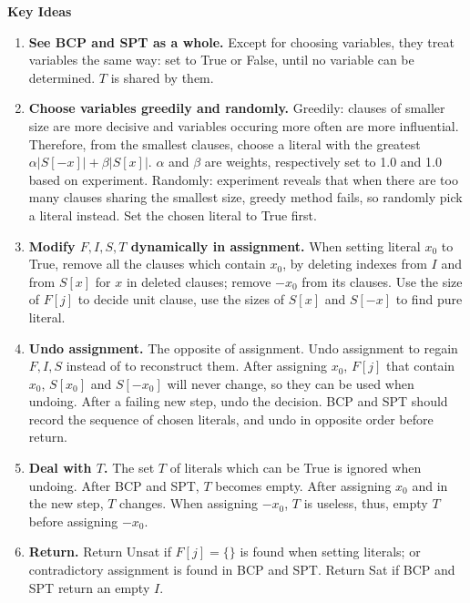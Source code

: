 \documentclass{article}
\begin{document}
	\textbf{Key Ideas}
	\begin{enumerate}
		\item \textbf{See BCP and SPT as a whole.} Except for choosing variables, they treat variables the same way: set to True or False, until no variable can be determined. $T$ is shared by them.
		\item \textbf{Choose variables greedily and randomly.} Greedily: clauses of smaller size are more decisive and variables occuring more often are more influential. Therefore, from the smallest clauses, choose a literal with the greatest $\alpha  |S[-x]| + \beta |S[x]|$. $\alpha$ and $\beta$ are weights, respectively set to 1.0 and 1.0 based on experiment. Randomly: experiment reveals that when there are too many clauses sharing the smallest size, greedy method fails, so randomly pick a literal instead. Set the chosen literal to True first.
		\item \textbf{Modify $F, I, S, T$ dynamically in assignment.} When setting literal $x_0$ to True, remove all the clauses which contain $x_0$, by deleting indexes from $I$ and from $S[x]$ for $x$ in deleted clauses; remove $-x_0$ from its clauses. Use the size of $F[j]$ to decide unit clause, use the sizes of $S[x]$ and $S[-x]$ to find pure literal.
		\item \textbf{Undo assignment.} The opposite of assignment. Undo assignment to regain $F, I, S$ instead of to reconstruct them.
		After assigning $x_0$, $F[j]$ that contain $x_0$, $S[x_0]$ and $S[-x_0]$ will never change, so they can be used when undoing.
		After a failing new step, undo the decision. 
		BCP and SPT should record the sequence of chosen literals, and undo in opposite order before return. 
		\item \textbf{Deal with $T$.} The set $T$ of literals which can be True is ignored when undoing.
		After BCP and SPT, $T$ becomes empty.
		After assigning $x_0$ and in the new step, $T$ changes. 
		When assigning $-x_0$, $T$ is useless, thus, empty $T$ before assigning $-x_0$. 
		\item \textbf{Return.}
		Return Unsat if $F[j]=\{\}$ is found when setting literals; or contradictory assignment is found in BCP and SPT.
		Return Sat if BCP and SPT return an empty $I$.
	\end{enumerate}
\end{document}
